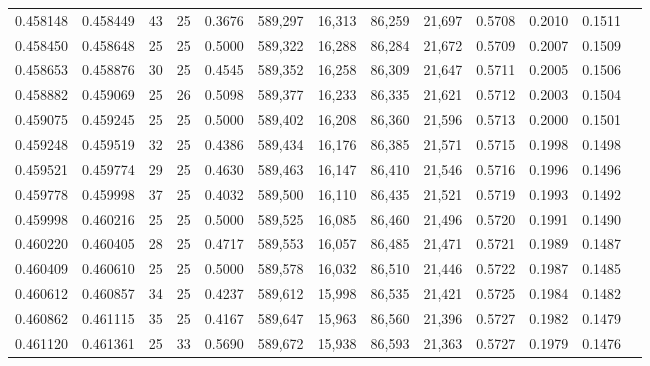 \begin{tabular}{rrrrrrrrrrrrr}
0.458148 & 0.458449 &    43 &  25 &                                     0.3676 & 589,297 &  16,313 &  86,259 &  21,697 & 0.5708 & 0.2010 & 0.1511 \\
0.458450 & 0.458648 &    25 &  25 &                                     0.5000 & 589,322 &  16,288 &  86,284 &  21,672 & 0.5709 & 0.2007 & 0.1509 \\
0.458653 & 0.458876 &    30 &  25 &                                     0.4545 & 589,352 &  16,258 &  86,309 &  21,647 & 0.5711 & 0.2005 & 0.1506 \\
0.458882 & 0.459069 &    25 &  26 &                                     0.5098 & 589,377 &  16,233 &  86,335 &  21,621 & 0.5712 & 0.2003 & 0.1504 \\
0.459075 & 0.459245 &    25 &  25 &                                     0.5000 & 589,402 &  16,208 &  86,360 &  21,596 & 0.5713 & 0.2000 & 0.1501 \\
0.459248 & 0.459519 &    32 &  25 &                                     0.4386 & 589,434 &  16,176 &  86,385 &  21,571 & 0.5715 & 0.1998 & 0.1498 \\
0.459521 & 0.459774 &    29 &  25 &                                     0.4630 & 589,463 &  16,147 &  86,410 &  21,546 & 0.5716 & 0.1996 & 0.1496 \\
0.459778 & 0.459998 &    37 &  25 &                                     0.4032 & 589,500 &  16,110 &  86,435 &  21,521 & 0.5719 & 0.1993 & 0.1492 \\
0.459998 & 0.460216 &    25 &  25 &                                     0.5000 & 589,525 &  16,085 &  86,460 &  21,496 & 0.5720 & 0.1991 & 0.1490 \\
0.460220 & 0.460405 &    28 &  25 &                                     0.4717 & 589,553 &  16,057 &  86,485 &  21,471 & 0.5721 & 0.1989 & 0.1487 \\
0.460409 & 0.460610 &    25 &  25 &                                     0.5000 & 589,578 &  16,032 &  86,510 &  21,446 & 0.5722 & 0.1987 & 0.1485 \\
0.460612 & 0.460857 &    34 &  25 &                                     0.4237 & 589,612 &  15,998 &  86,535 &  21,421 & 0.5725 & 0.1984 & 0.1482 \\
0.460862 & 0.461115 &    35 &  25 &                                     0.4167 & 589,647 &  15,963 &  86,560 &  21,396 & 0.5727 & 0.1982 & 0.1479 \\
0.461120 & 0.461361 &    25 &  33 &                                     0.5690 & 589,672 &  15,938 &  86,593 &  21,363 & 0.5727 & 0.1979 & 0.1476 \\

\end{tabular}
